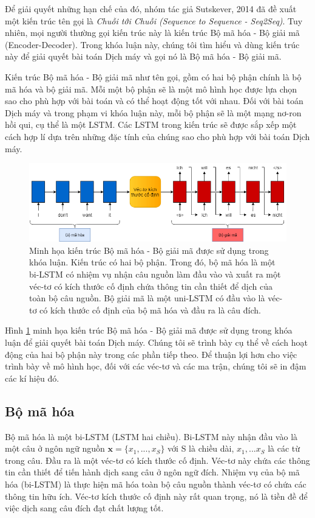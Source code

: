 Để giải quyết những hạn chế của đó, nhóm tác giả Sutskever, 2014 \cite{Seq2Seq2014} đã đề xuất một kiến trúc tên gọi là \textit{Chuỗi tới Chuỗi (Sequence to Sequence - Seq2Seq)}. Tuy nhiên, mọi người thường gọi kiến trúc này là kiến trúc Bộ mã hóa - Bộ giải mã (Encoder-Decoder). Trong khóa luận này, chúng tôi tìm hiểu và dùng kiến trúc này để giải quyết bài toán Dịch máy và gọi nó là Bộ mã hóa - Bộ giải mã.

Kiến trúc Bộ mã hóa - Bộ giải mã như tên gọi, gồm có hai bộ phận chính là bộ mã hóa và bộ giải mã. Mỗi một bộ phận sẽ là một mô hình học được lựa chọn sao cho phù hợp với bài toán và có thể hoạt động tốt với nhau. Đối với bài toán Dịch máy và trong phạm vi khóa luận này, mỗi bộ phận sẽ là một mạng nơ-ron hồi qui, cụ thể là một LSTM. Các LSTM trong kiến trúc sẽ được sắp xếp một cách hợp lí dựa trên những đặc tính của chúng sao cho phù hợp với bài toán Dịch máy.

\begin{figure}
	\centering
	\includegraphics[width=1.0\textwidth]{Encoder-Decoder_2}
	\caption[Minh họa kiến trúc Bộ mã hóa - Bộ giải mã được sử dụng trong khóa luận.]{Minh họa kiến trúc Bộ mã hóa - Bộ giải mã được sử dụng trong khóa luận. Kiến trúc có hai bộ phận. Trong đó, bộ mã hóa là một bi-LSTM có nhiệm vụ nhận câu nguồn làm đầu vào và xuất ra một véc-tơ có kích thước cố định chứa thông tin cần thiết để dịch của toàn bộ câu nguồn. Bộ giải mã là một uni-LSTM có đầu vào là véc-tơ có kích thước cố định của bộ mã hóa và đầu ra là câu đích.}
	\label{fig_Encoder-Decoder}
\end{figure}

Hình \ref{fig_Encoder-Decoder} minh họa kiến trúc Bộ mã hóa - Bộ giải mã được sử dụng trong khóa luận để giải quyết bài toán Dịch máy. Chúng tôi sẽ trình bày cụ thể về cách hoạt động của hai bộ phận này trong các phần tiếp theo. Để thuận lợi hơn cho việc trình bày về mô hình học, đối với các véc-tơ và các ma trận, chúng tôi sẽ in đậm các kí hiệu đó.

\subsection{Bộ mã hóa}
Bộ mã hóa là một bi-LSTM (LSTM hai chiều). Bi-LSTM này nhận đầu vào là một câu ở ngôn ngữ nguồn $\bm{x} = \{x_1, ..., x_S\}$ với S là chiều dài, $x_1,...x_S$ là các từ trong câu. Đầu ra là một véc-tơ có kích thước cố định. Véc-tơ này chứa các thông tin cần thiết để tiến hành dịch sang câu ở ngôn ngữ đích. Nhiệm vụ của bộ mã hóa (bi-LSTM) là thực hiện mã hóa toàn bộ câu nguồn thành véc-tơ có chứa các thông tin hữu ích. Véc-tơ kích thước cố định này rất quan trọng, nó là tiền đề để việc dịch sang câu đích đạt chất lượng tốt.

